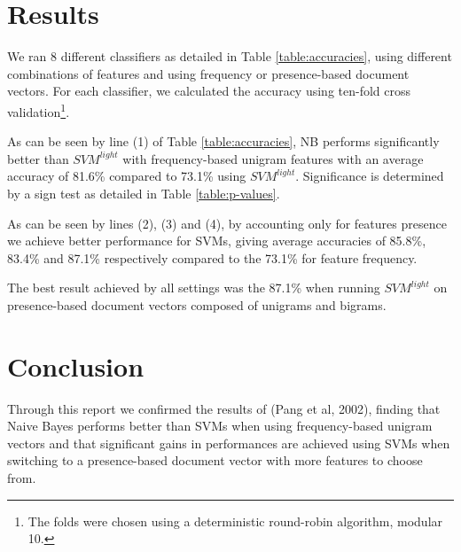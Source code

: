 \documentclass[12pt]{article}
\begin{document}
\begin{multicols}{2}
\section{Results}

We ran 8 different classifiers as detailed in Table \ref{table:accuracies}, using different combinations of features and using frequency or presence-based document vectors. For each classifier, we calculated the accuracy using ten-fold cross validation\footnote{The folds were chosen using a deterministic round-robin algorithm, modular 10.}.

As can be seen by line (1) of Table \ref{table:accuracies}, NB performs significantly better than $SVM^{light}$ with frequency-based unigram features with an average accuracy of 81.6\% compared to 73.1\% using $SVM^{light}$. Significance is determined by a sign test as detailed in Table \ref{table:p-values}.

As can be seen by lines (2), (3) and (4), by accounting only for features presence we achieve better performance for SVMs, giving average accuracies of 85.8\%, 83.4\% and 87.1\% respectively compared to the 73.1\%  for feature frequency.

The best result achieved by all settings was the 87.1\% when running $SVM^{light}$ on presence-based document vectors composed of unigrams and bigrams.

\section*{Conclusion}

Through this report we confirmed the results of (Pang et al, 2002), finding that Naive Bayes performs better than SVMs when using frequency-based unigram vectors and that significant gains in performances are achieved using SVMs when switching to a presence-based document vector with more features to choose from.

\end{multicols}
\end{document}
